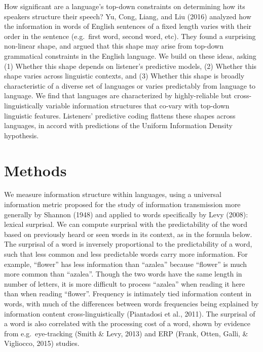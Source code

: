 \documentclass[
  english,
  man,floatsintext]{apa6}
\begin{document}
How significant are a language's top-down constraints on determining how its speakers structure their speech? Yu, Cong, Liang, and Liu (2016) analyzed how the information in words of English sentences of a fixed length varies with their order in the sentence (e.g.~first word, second word, etc). They found a surprising non-linear shape, and argued that this shape may arise from top-down grammatical constraints in the English language. We build on these ideas, asking (1) Whether this shape depends on listener's predictive models, (2) Whether this shape varies across linguistic contexts, and (3) Whether this shape is broadly characteristic of a diverse set of languages or varies predictably from language to language. We find that languages are characterized by highly-reliable but cross-linguistically variable information structures that co-vary with top-down linguistic features. Listeners' predictive coding flattens these shapes across languages, in accord with predictions of the Uniform Information Density hypothesis.

\hypertarget{methods}{%
\section{Methods}\label{methods}}

We measure information structure within languages, using a universal information metric proposed for the study of information transmission more generally by Shannon (1948) and applied to words specifically by Levy (2008): lexical surprisal. We can compute surprisal with the predictability of the word based on previously heard or seen words in its context, as in the formula below. The surprisal of a word is inversely proportional to the predictability of a word, such that less common and less predictable words carry more information. For example, ``flower'' has less information than ``azalea'' because ``flower'' is much more common than ``azalea''. Though the two words have the same length in number of letters, it is more difficult to process ``azalea'' when reading it here than when reading ``flower''. Frequency is intimately tied information content in words, with much of the differences between words frequencies being explained by information content cross-linguistically (Piantadosi et al., 2011). The surprisal of a word is also correlated with the processing cost of a word, shown by evidence from e.g.~eye-tracking (Smith \& Levy, 2013) and ERP (Frank, Otten, Galli, \& Vigliocco, 2015) studies.
\end{document}

